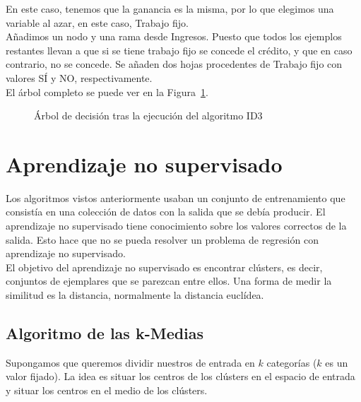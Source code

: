 \begin{ejemplo}
	En este caso, tenemos que la ganancia es la misma, por lo que elegimos una variable al azar, en este caso, Trabajo fijo.\\
	
	Añadimos un nodo y una rama desde Ingresos. Puesto que todos los ejemplos restantes llevan a que si se tiene trabajo fijo se concede el crédito, y que en caso contrario, no se concede. Se añaden dos hojas procedentes de Trabajo fijo con valores SÍ y NO, respectivamente.\\
	
	El árbol completo se puede ver en la Figura~\ref{fig:arboldecision}.\\
	
	\begin{figure}[htbp!]
		\label{fig:arboldecision}
		\begin{center}
			\ejemploarboldecision
		\end{center}
		\caption{Árbol de decisión tras la ejecución del algoritmo ID3}
	\end{figure}
\end{ejemplo}

\section{Aprendizaje no supervisado}

Los algoritmos vistos anteriormente usaban un conjunto de entrenamiento que consistía en una colección de datos con la salida que se debía producir. El aprendizaje no supervisado tiene conocimiento sobre los valores correctos de la salida. Esto hace que no se pueda resolver un problema de regresión con aprendizaje no supervisado.\\

El objetivo del aprendizaje no supervisado es encontrar clústers, es decir, conjuntos de ejemplares que se parezcan entre ellos. Una forma de medir la similitud es la distancia, normalmente la distancia euclídea.

\subsection{Algoritmo de las k-Medias}

Supongamos que queremos dividir nuestros de entrada en $k$ categorías ($k$ es un valor fijado). La idea es situar los centros de los clústers en el espacio de entrada y situar los centros en el medio de los clústers.\\

